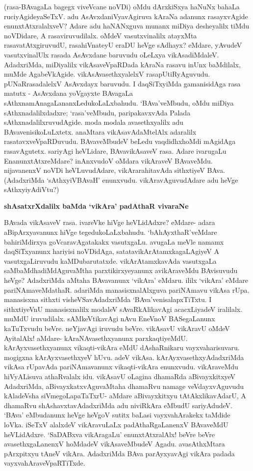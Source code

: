 \noindent
(rasa-BAvagaLa bagegx viveVcane noVDi) oMdu dArxkiSxya haNuNx bahaLa ruciyAgide\-yaSeTxV. adu AsAvxda\-niVyavAgiruva kAraNa adanunx rasayxvAgide enunxtAtxralalxveV? Adare adu haNANxguva munanx miDi\-ya desheyalilx tiMdu noVDidare, A rasaviruvudilalx. oMdeV vasutxvinalilx atayxMta rasavatAtxgiruvudU, rasahiVnateyU eraDU heVge sAdhayx? eMdare, yAvudeV vasutxvinalUlx rasada AsAvxdane baruvudu oLeLxya vikAsadiMdaleV. AdadxriMda, miDiyalilx vikAsaveVpaRDada kAraNa rasavu inUnx baMdilalx, muMde Aga\-beVkA\-gide. vikAsAvasethxyalelxV rasapUtiRyAguvudu. pUNaRrasadalelxV AsAvxdayx baruvudu. I daqSiTx\-yiMda gamanisidAga rasa matutx - AsAvxdana yoVgayxte BAvagaLa sAthxnamAnagaLananxLedukoLaLxbahudu. `BAva'veMbudu, oMdu miDiya sAthxnadalilxdadxre; `rasa'veMbudu, paripakavxvAda Palada sAthxnadalilxruvudAgide. moda modala avasethxyalilx adu BAvavenisikoLuLxtetx. anaMtara vikAsavAdaMtelAlx adaralilx rasatavxveVpaRDuvudu. BAva\-veMbudeV beLedu vaqdidhxhoMdi mAgidAga rasavAgutetx. sariyAgi heVLidare, BAvavikAsaveV rasa. Adare ivarugaLu EnanunxtAtxreMdare? inAnxvudoV oMdara vikAraveV BAvaveMdu. nijavanenxV noVDi heVLuvu\-dAdare, vikArarahitavAda sithxtiyeV BAva. (AdadxriMda `sAthxyiVBAvaH' enunxvudu. vikAravAguvu\-dAdare adu heVge sAthxyiyAdiVtu?)

{\bigskip
\noindent
{\large\bf shAsatxrXdalilx baMda `vikAra' padAthaR vivaraNe}}\label{page225}
\medskip

\noindent
BAvada vikAsaveV rasa. ivareVke hiVge heVLidAdxre? eMdare- adara aBipArxyavanunx hiVge tegedu\-koLaLxbahudu. `bAhAyxthaR'veMdare bahiriMdirxya goVcaravAgatakakx vasutxgaLu. avugaLa meVle namamx daqSiTxyanunx hariyisi noVDidAga, satatavikArAtamxkagaLAgiyeV A vasutxgaLiruvudu kaMDubarutatxde. vikA\-rAtamxkavAda vasutxgaLa saMbaMdhadiMdAguvaMtha parxtikirxyeyanunx avikAraveMdu BAvisuvudu heVge? Adadx\-riMda aMtaha BAvavanunx `vikAra' eMdaru. ililx `vikAra' eMdare pariNAmaveMdathaR. adariMda manasisx\-nalAlxguva pariNAmavu vikAsa rUpa. manasisxna sithxti visheVSavAdadxriMda `BAva'venisalapxTiTxtu. I sithxti\-yeVnU manasisxnalilx modaleV sAvaRkAlikavAgi acacxLiyadeV iralilalx. muMdU iruvudilalx. sAMkeV\-tikavAgi nAvu EneVnoV BASegaLanunx kaTuTxvudu beVre. neYjavAgi iruvudu beVre. vikAsavU vikA\-ravU oMdeV AyitalAlx! aMdare- kAraNAvasethxyanunx parxkaqtiyeMdU. kArAyxvasethxyanunx vikaqti-vikAra eMdU dAshaRnikaru vayxvaharisuvaru. mogigxna kArAyxvasethxyeV hUvu. adeV vikAsa. kArAyxvasethx\-yAdadx\-riMda vikAsa rUpavAda pariNAmavanunx vikaqti-vikAra enunxvudu. vikAraveMdu hiVyALisuva athaRvalalx idu. vikAsavU oLagina dhamaRda aBivayxkitxyeV AdadxriMda, aBivayxkatxvAguvaMtaha dhamaRvu namage veVdayxvAguvudu kAladeVsha siVmegoLapaTaTxrU- aMdare aBivayxkitxyu tAtAkxlikavAdarU, A dhamaRvu shAshavxtavAdadxriMda adu niviRkAra eMbudU sariyAdudeV. `BAva' eMbudanunx heVge heV\-goV sutitx baLasi vayxvahArakekx taMdide loVka. iSeTxV alalxdeV vikAravuLaLx padAthaRgaLanenxV BAvaveMdU heVLi\-dAdxre. `SaDABxva vikAragaLu'\label{226} enunxtAtxralAlx! beVre beVre avasethxgaLanenxV hoMdadeV vikAsaveMbudeV Agadu. avasAthxMtara pArxpitxyu tAneV vikAra. AdadxriMda BAva parAyxyavAgi vikAra padada vayxvahAra\-veVpaRTiTxde.

